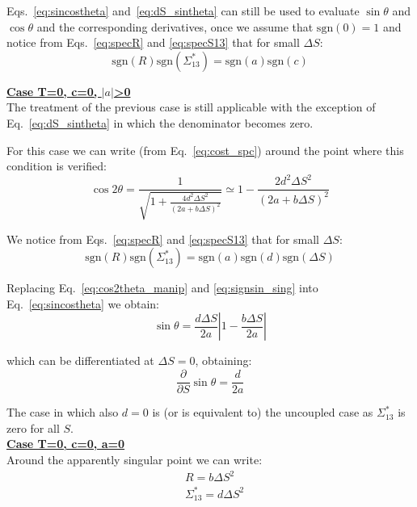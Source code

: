 Eqs.~\ref{eq:sincostheta} and~\ref{eq:dS_sintheta} can still be used to evaluate $\sin \theta$ and $\cos \theta$ and the corresponding derivatives, once we assume that $\mathrm{sgn}(0) = 1$ and notice from Eqs.~\ref{eq:specR} and \ref{eq:specS13} that for small $\Delta S$:
\begin{equation}
\mathrm{sgn}(R)\mathrm{sgn}(\Sigma^*_{13}) = \mathrm{sgn}(a)\mathrm{sgn}(c)
\end{equation}


\textbf{\underline{Case T=0, c=0, $\left| a \right|$>0}}
~\\

The treatment of the previous case is still applicable with the exception of Eq.~\ref{eq:dS_sintheta} in which the denominator becomes zero.

For this case we can write (from Eq.~\ref{eq:cost_spc}) around the point where this condition is verified:
\begin{equation}
\cos 2\theta =  \frac{1}{\sqrt{1+\frac{4d^2 \Delta S^2}{\left(2a +b \Delta S\right)^2}}} \simeq  
1-\frac{2d^2 \Delta S^2}{\left(2a +b \Delta S\right)^2}
\label{eq:cos2theta_manip}
\end{equation}

We notice from Eqs.~\ref{eq:specR} and \ref{eq:specS13} that for small $\Delta S$:
\begin{equation}
\mathrm{sgn}(R)\mathrm{sgn}(\Sigma^*_{13}) = \mathrm{sgn}(a)\mathrm{sgn}(d)\mathrm{sgn}(\Delta S)\label{eq:signsin_sing}
\end{equation}

Replacing Eq.~\ref{eq:cos2theta_manip} and \ref{eq:signsin_sing} into Eq.~\ref{eq:sincostheta}
we obtain:
\begin{equation}
\sin\theta =  \frac{d\Delta S}{2a} \left| 1 - \frac{b \Delta S}{2a}\right|
\end{equation}

which can be differentiated at $\Delta S = 0$, obtaining:
\begin{equation}
\frac{\partial }{\partial S} \sin \theta =\frac{d}{2a} 
\end{equation}

The case in which also $d=0$ is (or is equivalent to) the uncoupled case as $\Sigma^*_{13}$ is zero for all $S$.
~\\


\textbf{\underline{Case T=0, c=0, a=0}}
~\\

Around the apparently singular point we can write:
\begin{align}
&R = b \Delta S^2\\
&\Sigma^*_{13} =d \Delta S^2
\end{align}

